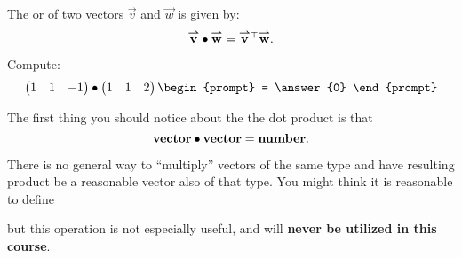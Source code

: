 \documentclass{ximera}
\begin{document}
\begin{definition}
  The  or  of two vectors
  $\vec{v}$ and $\vec{w}$ is given by:
  \[
  {\overset{\boldsymbol{\rightharpoonup}}{\mathbf{v}}}\hspace{0in}\bullet {\overset{\boldsymbol{\rightharpoonup}}{\mathbf{w}}}\hspace{0in} = {\overset{\boldsymbol{\rightharpoonup}}{\mathbf{v}}}\hspace{0in}^\top {\overset{\boldsymbol{\rightharpoonup}}{\mathbf{w}}}\hspace{0in}.
  \]
\end{definition}




\begin{question}
  Compute:
  \[
  \begin{pmatrix} 1 & 1 & -1 \end{pmatrix}
  \dotp\begin{pmatrix} 1 & 1 & 2\end{pmatrix}
  \begin{prompt}
    = \answer{0}
  \end{prompt}
  \]
\end{question}


The first thing you should notice about the the dot product is that
\[
\mathbf{vector}\bullet \mathbf{vector} = \mathbf{number}.
\]

\begin{warning}
  There is no general way to ``multiply'' vectors of the same type and
  have resulting product be a reasonable vector also of that type.
  You might think it is reasonable to define
  \begin{center}
  \end{center}
but this operation is not especially useful, and will \textbf{never be
  utilized in this course}.
\end{warning}
\end{document}
